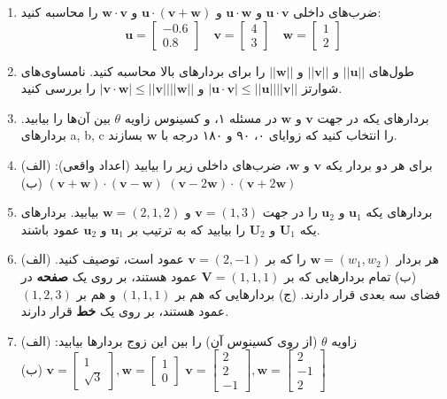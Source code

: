 \documentclass[12pt, a4paper]{book}
\begin{document}
	\begin{enumerate}
		\item ضرب‌های داخلی $\mathbf{u}\cdot\mathbf{v}$ و $\mathbf{u}\cdot\mathbf{w}$ و $\mathbf{u}\cdot(\mathbf{v}+\mathbf{w})$ و $\mathbf{w}\cdot\mathbf{v}$ را محاسبه کنید:
		\[ \mathbf{u} = \begin{bmatrix} -0.6 \\ 0.8 \end{bmatrix} \quad \mathbf{v} = \begin{bmatrix} 4 \\ 3 \end{bmatrix} \quad \mathbf{w} = \begin{bmatrix} 1 \\ 2 \end{bmatrix} \]
		\item طول‌های $||\mathbf{u}||$ و $||\mathbf{v}||$ و $||\mathbf{w}||$ را برای بردارهای بالا محاسبه کنید. نامساوی‌های شوارتز $| \mathbf{u}\cdot\mathbf{v} | \le ||\mathbf{u}|| ||\mathbf{v}||$ و $| \mathbf{v}\cdot\mathbf{w} | \le ||\mathbf{v}|| ||\mathbf{w}||$ را بررسی کنید.
		\item بردارهای یکه در جهت $\mathbf{v}$ و $\mathbf{w}$ در مسئله ۱، و کسینوس زاویه $\theta$ بین آن‌ها را بیابید. بردارهای a, b, c را انتخاب کنید که زوایای ۰، ۹۰ و ۱۸۰ درجه با $\mathbf{w}$ بسازند.
		\item برای هر دو بردار یکه $\mathbf{v}$ و $\mathbf{w}$، ضرب‌های داخلی زیر را بیابید (اعداد واقعی):
		(الف) $(\mathbf{v}+\mathbf{w}) \cdot (\mathbf{v}-\mathbf{w})$ \quad (ب) $(\mathbf{v}-2\mathbf{w}) \cdot (\mathbf{v}+2\mathbf{w})$
		\item بردارهای یکه $\mathbf{u}_1$ و $\mathbf{u}_2$ را در جهت $\mathbf{v}=(1,3)$ و $\mathbf{w}=(2,1,2)$ بیابید. بردارهای یکه $\mathbf{U}_1$ و $\mathbf{U}_2$ را بیابید که به ترتیب بر $\mathbf{u}_1$ و $\mathbf{u}_2$ عمود باشند.
		\item (الف) هر بردار $\mathbf{w}=(w_1, w_2)$ را که بر $\mathbf{v}=(2,-1)$ عمود است، توصیف کنید.
		(ب) تمام بردارهایی که بر $\mathbf{V}=(1,1,1)$ عمود هستند، بر روی یک \textbf{صفحه} در فضای سه بعدی قرار دارند.
		(ج) بردارهایی که هم بر $(1,1,1)$ و هم بر $(1,2,3)$ عمود هستند، بر روی یک \textbf{خط} قرار دارند.
		\item زاویه $\theta$ (از روی کسینوس آن) را بین این زوج بردارها بیابید:
		(الف) $\mathbf{v}=\begin{bmatrix} 1 \\ \sqrt{3} \end{bmatrix}, \mathbf{w}=\begin{bmatrix} 1 \\ 0 \end{bmatrix}$ \quad (ب) $\mathbf{v}=\begin{bmatrix} 2 \\ 2 \\ -1 \end{bmatrix}, \mathbf{w}=\begin{bmatrix} 2 \\ -1 \\ 2 \end{bmatrix}$
		

\end{enumerate}
\end{document}
